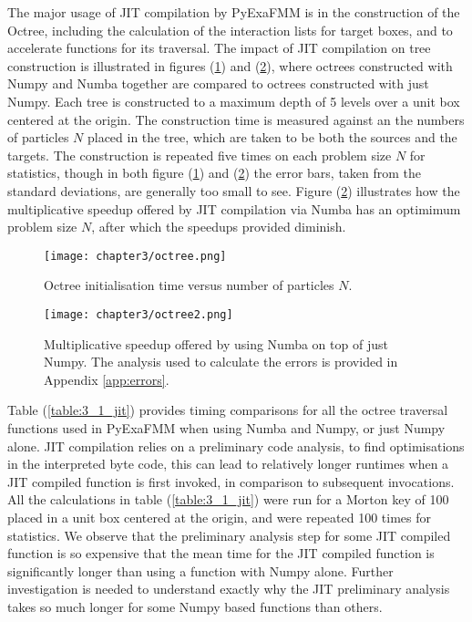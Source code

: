 The major usage of \gls{JIT} compilation by \gls{PyExaFMM} is in the construction
of the Octree, including the calculation of the interaction lists for target
boxes, and to accelerate functions for its traversal. The impact of \gls{JIT}
compilation on tree construction is illustrated in figures
(\ref{fig:3_1_octree}) and (\ref{fig:3_1_octree2}), where octrees constructed with
Numpy and Numba together are compared to octrees constructed with just Numpy.
Each tree is constructed to a maximum depth of 5 levels over a unit box
centered at the origin. The construction time is measured against an
the numbers of particles $N$ placed in the tree, which are taken to be
both the sources and the targets. The construction
is repeated five times on each problem size $N$ for statistics, though in both
figure (\ref{fig:3_1_octree}) and (\ref{fig:3_1_octree2}) the error bars, taken
from the standard deviations, are generally too small to see. Figure (\ref{fig:3_1_octree2})
illustrates how the multiplicative speedup offered by \gls{JIT} compilation via
Numba has an optimimum problem size $N$, after which the speedups provided diminish.

\begin{figure}[ht]
    \centering

  {\texttt{[image: chapter3/octree.png]}}
  \vspace{0pt}
    \caption{
        Octree initialisation time versus number of particles $N$.
    }
    \label{fig:3_1_octree}
\end{figure}

\begin{figure}[ht]
    \centering

  {\texttt{[image: chapter3/octree2.png]}}
  \vspace{0pt}
    \caption{
        Multiplicative speedup offered by using Numba on top of just Numpy.
        The analysis used to calculate the errors is provided in
        Appendix \ref{app:errors}.
    }
    \label{fig:3_1_octree2}
\end{figure}

Table (\ref{table:3_1_jit}) provides timing comparisons for all the octree traversal
functions used in \gls{PyExaFMM} when using Numba and Numpy, or just Numpy alone.
\gls{JIT} compilation relies on a preliminary code analysis, to find optimisations
in the interpreted byte code, this can lead to relatively longer runtimes when
a \gls{JIT} compiled function is first invoked, in comparison to subsequent
invocations. All the calculations in table (\ref{table:3_1_jit}) were run for a
Morton key of 100 placed in a unit box centered at the origin, and were repeated
100 times for statistics. We observe that the preliminary analysis step for
some \gls{JIT} compiled function is so expensive that the mean time for the \gls{JIT}
compiled function is significantly longer than using a function with Numpy alone.
Further investigation is needed to understand exactly why the \gls{JIT} preliminary
analysis takes so much longer for some Numpy based functions than others.

